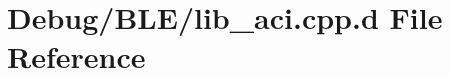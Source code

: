 \hypertarget{_debug_2_b_l_e_2lib__aci_8cpp_8d}{\section{\-Debug/\-B\-L\-E/lib\-\_\-aci.cpp.\-d \-File \-Reference}
\label{_debug_2_b_l_e_2lib__aci_8cpp_8d}
}
